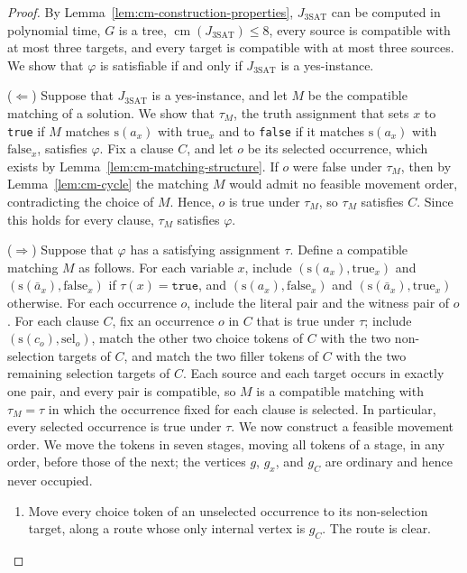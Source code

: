 \documentclass[a4paper,USenglish,thm-restate]{lipics-v2021}
\newcommand{\cm}{\operatorname{cm}}
\newcommand{\src}{\mathrm{s}}
\theoremstyle{problemstyle}
\begin{document}
\begin{proof}
By Lemma~\ref{lem:cm-construction-properties}, $J_{\mathrm{3SAT}}$ can be computed in
polynomial time, $G$ is a tree, $\cm(J_{\mathrm{3SAT}})\le 8$, every source is compatible
with at most three targets, and every target is compatible with at most
three sources. We show
that $\varphi$ is satisfiable if and only if $J_{\mathrm{3SAT}}$ is a yes-instance.

\smallskip
\noindent
($\Leftarrow$) Suppose that $J_{\mathrm{3SAT}}$ is a yes-instance, and let $M$ be the
compatible matching of a solution. We show that $\tau_M$, the truth
assignment that sets $x$ to \texttt{true} if $M$ matches $\src(a_x)$ with
$\mathrm{true}_x$ and to \texttt{false} if it matches $\src(a_x)$ with
$\mathrm{false}_x$, satisfies $\varphi$. Fix a clause $C$, and let $o$ be
its selected occurrence, which exists by
Lemma~\ref{lem:cm-matching-structure}. If $o$ were false under $\tau_M$,
then by Lemma~\ref{lem:cm-cycle} the matching $M$ would admit no feasible
movement order, contradicting the choice of $M$. Hence, $o$ is true under
$\tau_M$, so $\tau_M$ satisfies $C$. Since this holds for every clause,
$\tau_M$ satisfies $\varphi$.

\smallskip
\noindent
($\Rightarrow$) Suppose that $\varphi$ has a satisfying assignment $\tau$.
Define a compatible matching $M$ as follows. For each variable $x$, include
$(\src(a_x),\mathrm{true}_x)$ and $(\src(\bar a_x),\mathrm{false}_x)$ if
$\tau(x)=\texttt{true}$, and $(\src(a_x),\mathrm{false}_x)$ and
$(\src(\bar a_x),\mathrm{true}_x)$ otherwise. For each occurrence $o$,
include the literal pair and the witness pair of $o$. For each clause $C$,
fix an occurrence $o$ in $C$ that is true under $\tau$; include
$(\src(c_o),\mathrm{sel}_o)$, match the other two choice tokens of $C$
with the two non-selection targets of $C$, and match the two filler tokens
of $C$ with the two remaining selection targets of $C$. Each source and
each target occurs in exactly one pair, and every pair is compatible, so
$M$ is a compatible matching with $\tau_M=\tau$ in which the occurrence
fixed for each clause is selected. In particular, every selected occurrence is true under $\tau$. We now construct a feasible movement order. We move the tokens in
seven stages, moving all tokens of a stage, in any order, before those of
the next; the vertices $g$, $g_x$, and $g_C$ are ordinary and hence never
occupied.

\begin{enumerate}
\item Move every choice token of an unselected occurrence to its
non-selection target, along a route whose only internal vertex is $g_C$.
The route is clear.


\end{enumerate}
\end{proof}
\end{document}
